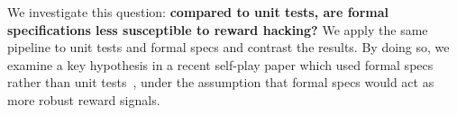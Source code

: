 We investigate this question:
\textbf{compared to unit tests, are formal specifications less susceptible to reward hacking?}
We apply the same pipeline to unit tests and formal specs 
and contrast the results. 
By doing so, we examine a key hypothesis in a recent self-play paper
which used formal specs rather than unit tests~\cite{PSV}, 
under the assumption that formal specs would act as more robust reward signals.


